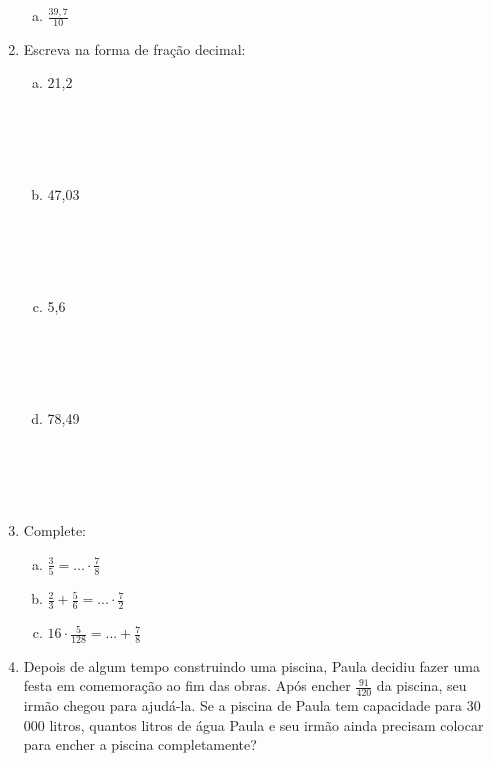 \documentclass[a4paper,14pt]{article}
\begin{document}
\begin{multicols}{2}
\begin{enumerate}
\begin{enumerate}[a)]
				\item $\frac{39,7}{10}$ \newpage
			\end{enumerate}
			\item Escreva na forma de fração decimal:
			\begin{enumerate}[a)]
				\item 21,2 \\\\\\\\\\
				\item 47,03 \\\\\\\\\\
				\item 5,6 \\\\\\\\\\
				\item 78,49 \\\\\\\\\\
			\end{enumerate}
			\item Complete:
			\begin{enumerate}[a)]
				\item $\frac{3}{5} = ... \cdot \frac{7}{8}$
				\item $\frac{2}{3} + \frac{5}{6} = ... \cdot \frac{7}{2}$
				\item $16 \cdot \frac{5}{128} = ... + \frac{7}{8}$
			\end{enumerate}
			\item Depois de algum tempo construindo uma piscina, Paula decidiu fazer uma festa em comemoração ao fim das obras. Após encher $\frac{91}{420}$ da piscina, seu irmão chegou para ajudá-la. Se a piscina de Paula tem capacidade para 30 000 litros, quantos litros de água Paula e seu irmão ainda precisam colocar para encher a piscina completamente? \\\\\\\\\\\\\\\\\\\\

\end{enumerate}
\end{multicols}
\end{document}
